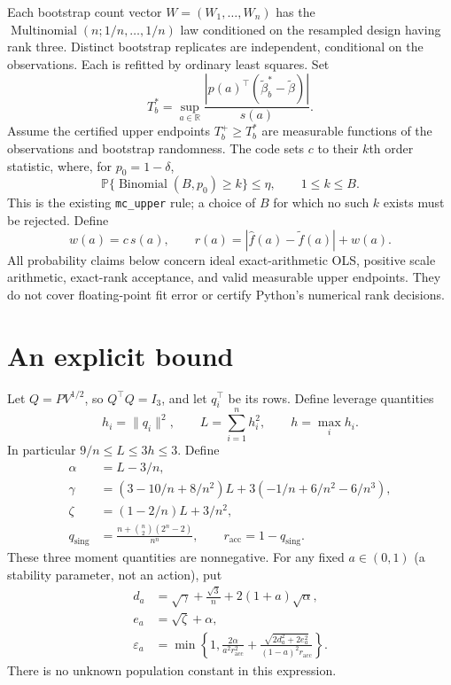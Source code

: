 \documentclass[11pt]{article}
\newcommand{\Prob}{\mathbb P}
\newcommand{\R}{\mathbb R}
\begin{document}
Each bootstrap count vector $W=(W_1,\ldots,W_n)$ has the
$\operatorname{Multinomial}(n;1/n,\ldots,1/n)$ law conditioned on the resampled
design having rank three. Distinct bootstrap replicates are independent,
conditional on the observations. Each is refitted by ordinary least squares.
Set
\[
 T_b^*=\sup_{a\in\R}
 \frac{|p(a)^\top(\widetilde\beta_b^*-\widetilde\beta)|}{s(a)}.
\]
Assume the certified upper endpoints $T_b^+\ge T_b^*$ are measurable functions
of the observations and bootstrap randomness. The code sets $c$ to
their $k$th order statistic, where, for $p_0=1-\delta$,
\begin{equation}\label{eq:rank}
 \Prob\{\operatorname{Binomial}(B,p_0)\ge k\}\le\eta,
 \qquad 1\le k\le B.
\end{equation}
This is the existing \texttt{mc\_upper} rule; a choice of $B$ for which no such
$k$ exists must be rejected. Define
\[
 w(a)=c\,s(a),\qquad
 r(a)=|\widehat f(a)-\widetilde f(a)|+w(a).
\]
All probability claims below concern ideal exact-arithmetic OLS, positive
scale arithmetic, exact-rank acceptance, and valid measurable upper endpoints.
They do not cover floating-point fit error or certify Python's numerical
rank decisions.

\section{An explicit bound}

Let $Q=PV^{1/2}$, so $Q^\top Q=I_3$, and let $q_i^\top$ be its rows.
Define leverage quantities
\[
 h_i=\|q_i\|^2,\qquad L=\sum_{i=1}^n h_i^2,
 \qquad h=\max_i h_i.
\]
In particular $9/n\le L\le3h\le3$. Define
\begin{align*}
 \alpha&=L-3/n,\\
 \gamma&=(3-10/n+8/n^2)L
             +3(-1/n+6/n^2-6/n^3),\\
 \zeta&=(1-2/n)L+3/n^2,\\
 q_{\mathrm{sing}}
   &=\frac{n+\binom n2(2^n-2)}{n^n},\qquad
 r_{\mathrm{acc}}=1-q_{\mathrm{sing}}.
\end{align*}
These three moment quantities are nonnegative. For any fixed $a\in(0,1)$
(a stability parameter, not an action), put
\begin{align}
 d_a&=\sqrt\gamma+\frac{\sqrt3}{n}
                       +2(1+a)\sqrt\alpha,\nonumber\\
 e_a&=\sqrt\zeta+\alpha,\nonumber\\
 \varepsilon_a
 &=\min\left\{1,
       \frac{2\alpha}{a^2r_{\mathrm{acc}}^2}
       +\frac{\sqrt{2d_a^2+2e_a^2}}
         {(1-a)^2r_{\mathrm{acc}}}\right\}.
 \label{eq:epsilon}
\end{align}
There is no unknown population constant in this expression.
\end{document}
